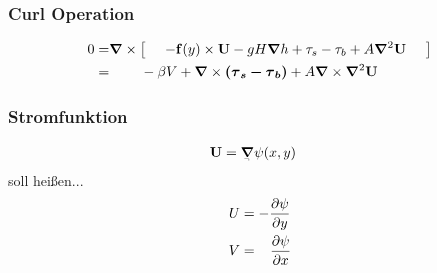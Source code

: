 \begin{frame}
\frametitle{Curl Operation}
\begin{align}
	0
	=&  \mathbf{\bm{\nabla}} \times \left[ \;\;\;\;\;   -\mathbf{\bm{f}}(y) \times \mathbf{\bm{U}}   -    g H \mathbf{\bm{\nabla}}{h} + \mathbf{\tau}_{s} - \mathbf{\tau}_{b} + A  \mathbf{\bm{\nabla}}^{2} \mathbf{\bm{U}}  \;\;\;\;\;   \right]  \nonumber \\
	=& \;\;\;\;\; \;\;\; -\beta V  + \mathbf{\bm{\nabla}} \times \mathbf{\bm{\left( \mathbf{\tau}_{s}- \mathbf{\tau}_{b} \right)}}  + A  \mathbf{\bm{\nabla}} \times \mathbf{\bm{\nabla}}^{2} \mathbf{\bm{U}}    \nonumber 
\end{align}
\end{frame}

\begin{frame}
\frametitle{Stromfunktion}
\begin{align}
 \vec{U}&=\tsca{\grad} \psi(x,y) 
\end{align}
soll heißen...
\begin{align}
	U &= -\frac{\partial\psi}{\partial y}  \nonumber  \\
	V &= \;\;\; \frac{\partial\psi}{\partial x}   \nonumber 
\end{align}
\end{frame}

